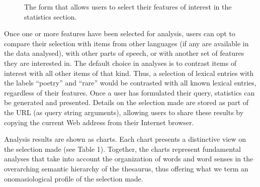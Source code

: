 \begin{figure}[htbp]
	\caption[]{\label{fig:Stolk2021a:Fig14} The form that allows users to select their features of interest in the statistics section.}
\end{figure}

Once one or more features have been selected for analysis, users can opt to compare their selection with items from other languages (if any are available in the data analysed), with other parts of speech, or with another set of features they are interested in. The default choice in analyses is to contrast items of interest with all other items of that kind. Thus, a selection of lexical entries with the labels “poetry” and “rare” would be contrasted with all known lexical entries, regardless of their features. Once a user has formulated their query, statistics can be generated and presented. Details on the selection made are stored as part of the URL (as query string arguments), allowing users to share these results by copying the current Web address from their Internet browser.

Analysis results are shown as charts. Each chart presents a distinctive view on the selection made (see Table 1). Together, the charts represent fundamental analyses that take into account the organization of words and word senses in the overarching semantic hierarchy of the thesaurus, thus offering what we term an onomasiological profile of the selection made.

